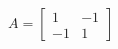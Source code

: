 \documentclass[preview]{standalone}
\begin{document}
\begin{align*}
A = \begin{bmatrix} 1 & -1 \\ -1 & 1 \end{bmatrix}
\end{align*}
\end{document}
